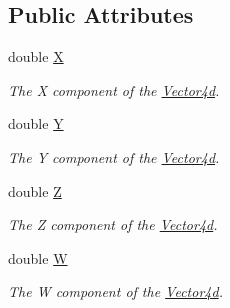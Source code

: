 \subsection*{Public Attributes}
\begin{DoxyCompactItemize}
\item 
double \hyperlink{struct_open_t_k_1_1_vector4d_a323a82aafae6e3970430a78a61fd913d}{X}
\begin{DoxyCompactList}\small\item\em The X component of the \hyperlink{struct_open_t_k_1_1_vector4d}{Vector4d}. \end{DoxyCompactList}\item 
double \hyperlink{struct_open_t_k_1_1_vector4d_a4937063b60b49337bf5ed66f2d360219}{Y}
\begin{DoxyCompactList}\small\item\em The Y component of the \hyperlink{struct_open_t_k_1_1_vector4d}{Vector4d}. \end{DoxyCompactList}\item 
double \hyperlink{struct_open_t_k_1_1_vector4d_a73d5452aab4b549eecaeb9261e85d184}{Z}
\begin{DoxyCompactList}\small\item\em The Z component of the \hyperlink{struct_open_t_k_1_1_vector4d}{Vector4d}. \end{DoxyCompactList}\item 
double \hyperlink{struct_open_t_k_1_1_vector4d_af86fa9579a6d45d153d0afceee1173ea}{W}
\begin{DoxyCompactList}\small\item\em The W component of the \hyperlink{struct_open_t_k_1_1_vector4d}{Vector4d}. \end{DoxyCompactList}\end{DoxyCompactItemize}
